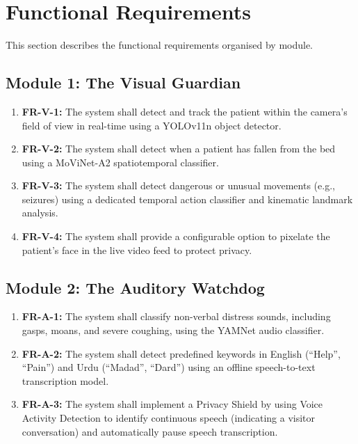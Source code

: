 \section{Functional Requirements}
\label{sec:functional_reqs}

This section describes the functional requirements organised by module.

\subsection{Module 1: The Visual Guardian}
\begin{enumerate}
    \item \textbf{FR-V-1:} The system shall detect and track the patient within
    the camera's field of view in real-time using a YOLOv11n object detector.
    \item \textbf{FR-V-2:} The system shall detect when a patient has fallen from
    the bed using a MoViNet-A2 spatiotemporal classifier.
    \item \textbf{FR-V-3:} The system shall detect dangerous or unusual movements
    (e.g., seizures) using a dedicated temporal action classifier and kinematic
    landmark analysis.
    \item \textbf{FR-V-4:} The system shall provide a configurable option to
    pixelate the patient's face in the live video feed to protect privacy.
\end{enumerate}

\subsection{Module 2: The Auditory Watchdog}
\begin{enumerate}
    \item \textbf{FR-A-1:} The system shall classify non-verbal distress sounds,
    including gasps, moans, and severe coughing, using the YAMNet audio classifier.
    \item \textbf{FR-A-2:} The system shall detect predefined keywords in English
    (``Help'', ``Pain'') and Urdu (``Madad'', ``Dard'') using an offline
    speech-to-text transcription model.
    \item \textbf{FR-A-3:} The system shall implement a Privacy Shield by using
    Voice Activity Detection to identify continuous speech (indicating a visitor
    conversation) and automatically pause speech transcription.
\end{enumerate}

